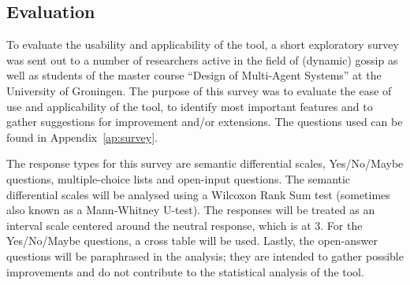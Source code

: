 \subsection{Evaluation}

To evaluate the usability and applicability of the tool,
a short exploratory survey was sent out to a number of researchers active in the field of (dynamic) gossip as well as students of the master course ``Design of Multi-Agent Systems'' at the University of Groningen.
The purpose of this survey was to evaluate the ease of use and applicability of the tool,
to identify most important features and to gather suggestions for improvement and/or extensions.
The questions used can be found in Appendix~\ref{ap:survey}.

The response types for this survey are semantic differential scales, Yes/No/Maybe questions, multiple-choice lists and open-input questions. The semantic differential scales will be analysed using a Wilcoxon Rank Sum test (sometimes also known as a Mann-Whitney U-test). 
The responses will be treated as an interval scale centered around the neutral response, which is at 3.
For the Yes/No/Maybe questions, a cross table will be used.
Lastly, the open-answer questions will be paraphrased in the analysis; 
they are intended to gather possible improvements and do not contribute to the statistical analysis of the tool.